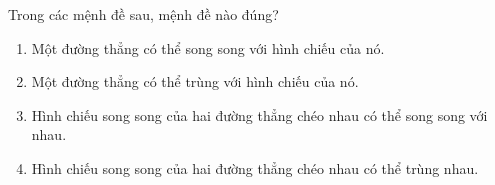\begin{bt}%
	Trong các mệnh đề sau, mệnh đề nào đúng?
	\begin{enumerate}
		\item Một đường thẳng có thể song song với hình chiếu của nó.
		\item Một đường thẳng có thể trùng với hình chiếu của nó.
		\item Hình chiếu song song của hai đường thẳng chéo nhau có thể song song với nhau.
		\item Hình chiếu song song của hai đường thẳng chéo nhau có thể trùng nhau.
	\end{enumerate}
\end{bt}

